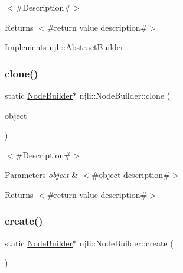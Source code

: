 $<$\#\+Description\#$>$

\begin{DoxyReturn}{Returns}
$<$\#return value description\#$>$ 
\end{DoxyReturn}


Implements \mbox{\hyperlink{classnjli_1_1_abstract_builder_aa1d220053e182c37b31b427499c6eacf}{njli\+::\+Abstract\+Builder}}.

\mbox{\label{classnjli_1_1_node_builder_aeb94f3016709aa566a40ee440d33faff}} 
\subsubsection{\texorpdfstring{clone()}{clone()}}
{\footnotesize\ttfamily static \mbox{\hyperlink{classnjli_1_1_node_builder}{Node\+Builder}}$\ast$ njli\+::\+Node\+Builder\+::clone (\begin{DoxyParamCaption}\item[{const \mbox{\hyperlink{classnjli_1_1_node_builder}{Node\+Builder}} \&}]{object }\end{DoxyParamCaption})\hspace{0.3cm}{\ttfamily [static]}}

$<$\#\+Description\#$>$


\begin{DoxyParams}{Parameters}
{\em object} & $<$\#object description\#$>$\\
\hline
\end{DoxyParams}
\begin{DoxyReturn}{Returns}
$<$\#return value description\#$>$ 
\end{DoxyReturn}
\mbox{\label{classnjli_1_1_node_builder_ac22ec084ecc2a6e4fed2ded2677c6092}} 
\subsubsection{\texorpdfstring{create()}{create()}}
{\footnotesize\ttfamily static \mbox{\hyperlink{classnjli_1_1_node_builder}{Node\+Builder}}$\ast$ njli\+::\+Node\+Builder\+::create (\begin{DoxyParamCaption}{ }\end{DoxyParamCaption})\hspace{0.3cm}{\ttfamily [static]}}

